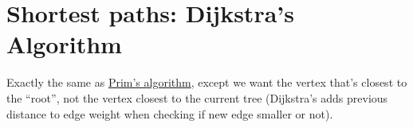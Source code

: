 \section{Shortest paths: Dijkstra's Algorithm}
\label{sec:dijkstras}

Exactly the same as \hyperref[sec:prims-algorithm]{Prim's algorithm}, except we want the vertex that's closest to the ``root'', not the vertex closest to the current tree (Dijkstra's adds previous distance to edge weight when checking if new edge smaller or not).
